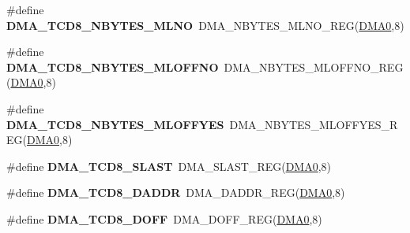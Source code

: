 \begin{DoxyCompactItemize}
\item 
\#define {\bfseries D\+M\+A\+\_\+\+T\+C\+D8\+\_\+\+N\+B\+Y\+T\+E\+S\+\_\+\+M\+L\+NO}~D\+M\+A\+\_\+\+N\+B\+Y\+T\+E\+S\+\_\+\+M\+L\+N\+O\+\_\+\+R\+EG(\hyperlink{group__DMA__Peripheral__Access__Layer_ga4103044f9ca209772f513dc694513ffb}{D\+M\+A0},8)\hypertarget{group__DMA__Register__Accessor__Macros_gaf790a6c71e0fbfc98f7c7edea11862e7}{}\label{group__DMA__Register__Accessor__Macros_gaf790a6c71e0fbfc98f7c7edea11862e7}

\item 
\#define {\bfseries D\+M\+A\+\_\+\+T\+C\+D8\+\_\+\+N\+B\+Y\+T\+E\+S\+\_\+\+M\+L\+O\+F\+F\+NO}~D\+M\+A\+\_\+\+N\+B\+Y\+T\+E\+S\+\_\+\+M\+L\+O\+F\+F\+N\+O\+\_\+\+R\+EG(\hyperlink{group__DMA__Peripheral__Access__Layer_ga4103044f9ca209772f513dc694513ffb}{D\+M\+A0},8)\hypertarget{group__DMA__Register__Accessor__Macros_gae2ff09bfa732b7e37ba88433b2a69e39}{}\label{group__DMA__Register__Accessor__Macros_gae2ff09bfa732b7e37ba88433b2a69e39}

\item 
\#define {\bfseries D\+M\+A\+\_\+\+T\+C\+D8\+\_\+\+N\+B\+Y\+T\+E\+S\+\_\+\+M\+L\+O\+F\+F\+Y\+ES}~D\+M\+A\+\_\+\+N\+B\+Y\+T\+E\+S\+\_\+\+M\+L\+O\+F\+F\+Y\+E\+S\+\_\+\+R\+EG(\hyperlink{group__DMA__Peripheral__Access__Layer_ga4103044f9ca209772f513dc694513ffb}{D\+M\+A0},8)\hypertarget{group__DMA__Register__Accessor__Macros_ga16dfd53221d052e7931b716d37783ecc}{}\label{group__DMA__Register__Accessor__Macros_ga16dfd53221d052e7931b716d37783ecc}

\item 
\#define {\bfseries D\+M\+A\+\_\+\+T\+C\+D8\+\_\+\+S\+L\+A\+ST}~D\+M\+A\+\_\+\+S\+L\+A\+S\+T\+\_\+\+R\+EG(\hyperlink{group__DMA__Peripheral__Access__Layer_ga4103044f9ca209772f513dc694513ffb}{D\+M\+A0},8)\hypertarget{group__DMA__Register__Accessor__Macros_ga3c48604678432613c2255a9ccf1ee23c}{}\label{group__DMA__Register__Accessor__Macros_ga3c48604678432613c2255a9ccf1ee23c}

\item 
\#define {\bfseries D\+M\+A\+\_\+\+T\+C\+D8\+\_\+\+D\+A\+D\+DR}~D\+M\+A\+\_\+\+D\+A\+D\+D\+R\+\_\+\+R\+EG(\hyperlink{group__DMA__Peripheral__Access__Layer_ga4103044f9ca209772f513dc694513ffb}{D\+M\+A0},8)\hypertarget{group__DMA__Register__Accessor__Macros_ga6585193ba70d793fa96c368446847218}{}\label{group__DMA__Register__Accessor__Macros_ga6585193ba70d793fa96c368446847218}

\item 
\#define {\bfseries D\+M\+A\+\_\+\+T\+C\+D8\+\_\+\+D\+O\+FF}~D\+M\+A\+\_\+\+D\+O\+F\+F\+\_\+\+R\+EG(\hyperlink{group__DMA__Peripheral__Access__Layer_ga4103044f9ca209772f513dc694513ffb}{D\+M\+A0},8)\hypertarget{group__DMA__Register__Accessor__Macros_ga87de01c15f745a0d3fb02b2b0b13764c}{}\label{group__DMA__Register__Accessor__Macros_ga87de01c15f745a0d3fb02b2b0b13764c}


\end{DoxyCompactItemize}

